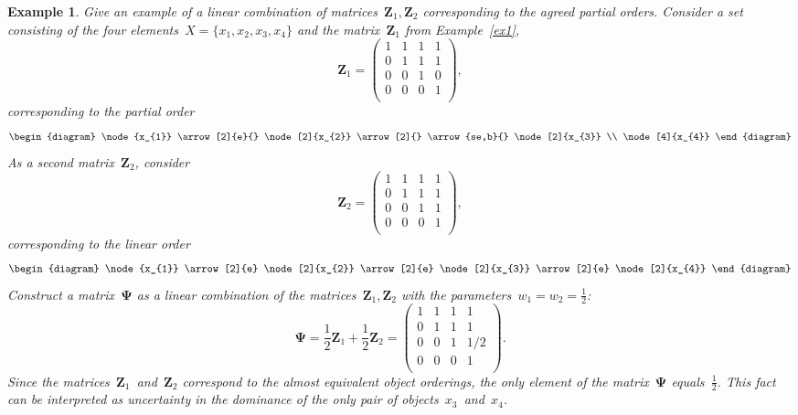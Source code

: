 \documentclass[12pt,preprint]{elsarticle}
\newcommand{\bZ}{\mathbf{Z}}
\newcommand{\bPsi}{\boldsymbol{\Psi}}
\newtheorem{Ex}{Example}
\begin{document}
\begin{Ex}
Give an example of a linear combination of matrices~$\bZ_1,\bZ_2$ corresponding to the agreed partial orders. Consider a set consisting of the four elements~$X=\{x_1,x_2,x_3,x_4\}$ and the matrix~$\bZ_1$ from Example~\ref{ex1},
\[
\bZ_1=
\begin{pmatrix}
1 & 1 & 1 & 1 \\
0 & 1 & 1 & 1 \\
0 & 0 & 1 & 0 \\
0 & 0 & 0 & 1 \\
\end{pmatrix},
\]
corresponding to the partial order
\[
\begin{diagram}
\node{x_{1}} \arrow[2]{e}{}
\node[2]{x_{2}} \arrow[2]{}
\arrow{se,b}{}
\node[2]{x_{3}} \\
\node[4]{x_{4}} %
\end{diagram}
\]
As a second matrix~$\bZ_2$, consider
\[
\bZ_2=
\begin{pmatrix}
1 & 1 & 1 & 1 \\
0 & 1 & 1 & 1 \\
0 & 0 & 1 & 1 \\
0 & 0 & 0 & 1 \\
\end{pmatrix},
\]
corresponding to the linear order
\[
\begin{diagram}
\node{x_{1}} \arrow[2]{e}
\node[2]{x_{2}} \arrow[2]{e}
\node[2]{x_{3}} \arrow[2]{e}
\node[2]{x_{4}}
\end{diagram}
\]
Construct a matrix~$\bPsi$ as a linear combination of the matrices~$\bZ_1,\bZ_2$ with the parameters~$w_1=w_2=\frac{1}{2}$:
\[
\bPsi=\frac{1}{2}\bZ_1+\frac{1}{2}\bZ_2=
\begin{pmatrix}
1 & 1 & 1 & 1 \\
0 & 1 & 1 & 1 \\
0 & 0 & 1 & 1/2 \\
0 & 0 & 0 & 1 \\
\end{pmatrix}.
\]
Since the matrices~$\bZ_1$~and~$\bZ_2$ correspond to the almost equivalent object orderings, the only element of the matrix~$\bPsi$ equals~$\frac{1}{2}$. This fact can be interpreted as uncertainty in the dominance of the only pair of objects~$x_3$~and~$x_4$.
\end{Ex}
\end{document}
